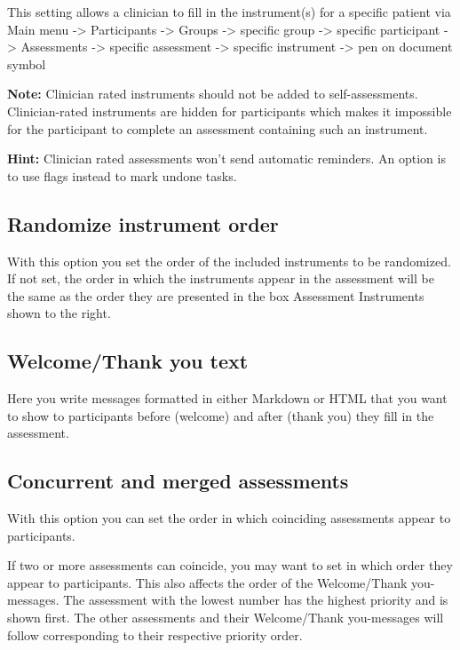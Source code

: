 \documentclass[]{book}
\begin{document}
This setting allows a clinician to fill in the instrument(s) for a specific patient via Main menu -\textgreater{} Participants -\textgreater{} Groups -\textgreater{} specific group -\textgreater{} specific participant -\textgreater{} Assessments -\textgreater{} specific assessment -\textgreater{} specific instrument -\textgreater{} pen on document symbol

\textbf{Note:} Clinician rated instruments should not be added to self-assessments. Clinician-rated instruments are hidden for participants which makes it impossible for the participant to complete an assessment containing such an instrument.

\textbf{Hint:} Clinician rated assessments won't send automatic reminders. An option is to use flags instead to mark undone tasks.

\hypertarget{randomize-instrument-order}{%
\subsection{Randomize instrument order}\label{randomize-instrument-order}}

With this option you set the order of the included instruments to be randomized. If not set, the order in which the instruments appear in the assessment will be the same as the order they are presented in the box Assessment Instruments shown to the right.

\hypertarget{welcomethank-you-text}{%
\subsection{Welcome/Thank you text}\label{welcomethank-you-text}}

Here you write messages formatted in either Markdown or HTML that you want to show to participants before (welcome) and after (thank you) they fill in the assessment.

\hypertarget{concurrent-and-merged-assessments}{%
\subsection{Concurrent and merged assessments}\label{concurrent-and-merged-assessments}}

With this option you can set the order in which coinciding assessments appear to participants.

If two or more assessments can coincide, you may want to set in which order they appear to participants. This also affects the order of the Welcome/Thank you-messages. The assessment with the lowest number has the highest priority and is shown first. The other assessments and their Welcome/Thank you-messages will follow corresponding to their respective priority order.
\end{document}
